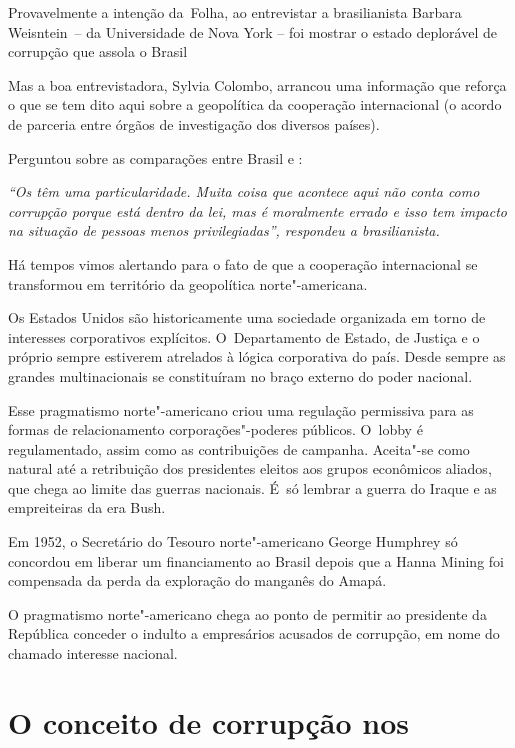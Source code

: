  

Provavelmente a intenção da~{Folha, ao
entrevistar a brasilianista Barbara Weisntein}~-- da Universidade de
Nova York -- foi mostrar o estado deplorável de corrupção que assola o
Brasil

Mas a boa entrevistadora, Sylvia Colombo, arrancou uma informação que
reforça o que se tem dito aqui sobre a geopolítica da cooperação
internacional (o acordo de parceria entre órgãos de investigação dos
diversos países).

Perguntou sobre as comparações entre Brasil e :

\emph{``Os  têm uma particularidade. Muita coisa que acontece aqui
não conta como corrupção porque está dentro da lei, mas é moralmente
errado e isso tem impacto na situação de pessoas menos privilegiadas'',
respondeu a brasilianista.}

Há tempos vimos alertando para o fato de que a cooperação internacional
se transformou em território da geopolítica norte"-americana.

Os Estados Unidos são historicamente uma sociedade organizada em torno
de interesses corporativos explícitos. O~Departamento de Estado, de
Justiça e o próprio  sempre estiverem atrelados à lógica corporativa
do país. Desde sempre as grandes multinacionais se constituíram no braço
externo do poder nacional.

Esse pragmatismo norte"-americano criou uma regulação permissiva para as
formas de relacionamento corporações"-poderes públicos. O~lobby é
regulamentado, assim como as contribuições de campanha. Aceita"-se como
natural até a retribuição dos presidentes eleitos aos grupos econômicos
aliados, que chega ao limite das guerras nacionais. É~só lembrar a
guerra do Iraque e as empreiteiras da era Bush.

Em 1952, o Secretário do Tesouro norte"-americano George Humphrey só
concordou em liberar um financiamento ao Brasil depois que a Hanna
Mining foi compensada da perda da exploração do manganês do Amapá.

O pragmatismo norte"-americano chega ao ponto de permitir ao presidente
da República conceder o indulto a empresários acusados de corrupção, em
nome do chamado interesse nacional.

\section{O conceito de corrupção nos }

